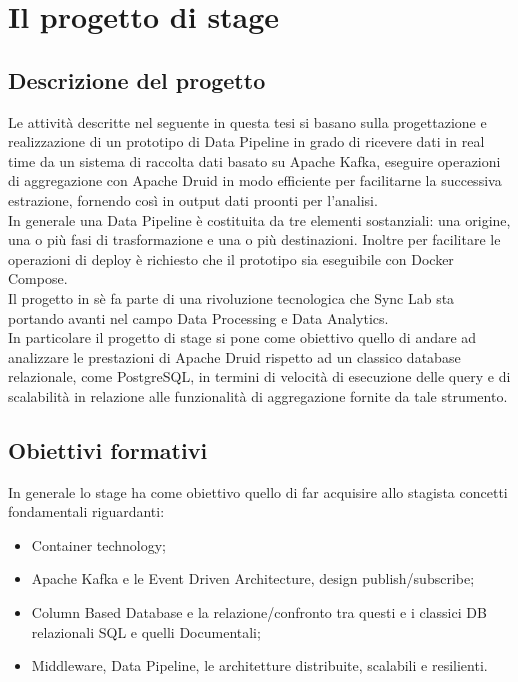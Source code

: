 \section{Il progetto di stage}
\subsection{Descrizione del progetto}
Le attività descritte nel seguente in questa tesi si basano sulla progettazione e realizzazione di un prototipo di \gls{Data Pipeline}{} in grado di ricevere dati in real time da un sistema di raccolta dati basato su Apache Kafka, eseguire operazioni di aggregazione con Apache Druid in modo efficiente per facilitarne la successiva estrazione, fornendo così in output dati proonti per l'analisi.\\
In generale una \gls{Data Pipeline}{} è costituita da tre elementi sostanziali: una origine, una o più fasi di trasformazione e una o più destinazioni.
Inoltre per facilitare le operazioni di deploy è richiesto che il prototipo sia eseguibile con Docker Compose. \\
Il progetto in sè fa parte di una rivoluzione tecnologica che Sync Lab sta portando avanti nel campo Data Processing e Data Analytics. \\
In particolare il progetto di stage si pone come obiettivo quello di andare ad analizzare le prestazioni di Apache Druid rispetto ad un classico database relazionale, come PostgreSQL, in termini di velocità di esecuzione delle query e di scalabilità in relazione alle funzionalità di aggregazione fornite da tale strumento. 
\subsection{Obiettivi formativi}
In generale lo stage ha come obiettivo quello di far acquisire allo stagista concetti fondamentali riguardanti: 
\begin{itemize}
    \item Container technology;
    \item Apache Kafka e le Event Driven Architecture, design publish/subscribe;
    \item Column Based Database e la relazione/confronto tra questi e i classici DB relazionali SQL e quelli
    Documentali;
    \item Middleware, \gls{Data Pipeline}{}, le architetture distribuite, scalabili e resilienti.
\end{itemize}
